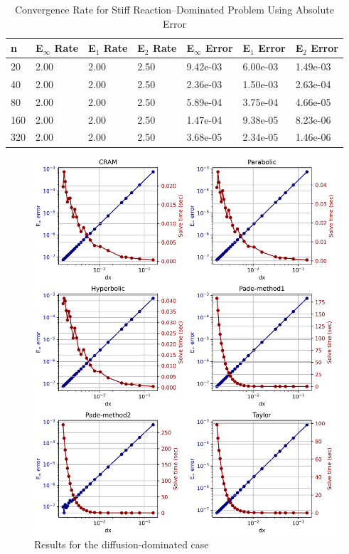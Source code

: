 \begin{table}[h]
   \caption{\label{tab:diffusion_spatial_convergence_stiff_reaction_dom} Convergence Rate for Stiff Reaction--Dominated Problem Using Absolute Error}
   \centering
   \begin{tabular}{lllllll}
   \hline
    n & E${}_{\infty}$ Rate & E${}_{1}$ Rate & E${}_{2}$ Rate & E${}_{\infty}$ Error & E${}_{1}$ Error & E${}_{2}$ Error\\
   \hline
    20 & 2.00 & 2.00 & 2.50 & 9.42e-03 & 6.00e-03 & 1.49e-03 \\ 
    40 & 2.00 & 2.00 & 2.50 & 2.36e-03 & 1.50e-03 & 2.63e-04 \\ 
    80 & 2.00 & 2.00 & 2.50 & 5.89e-04 & 3.75e-04 & 4.66e-05 \\ 
   160 & 2.00 & 2.00 & 2.50 & 1.47e-04 & 9.38e-05 & 8.23e-06 \\ 
   320 & 2.00 & 2.00 & 2.50 & 3.68e-05 & 2.34e-05 & 1.46e-06 \\ 
   \hline
   \end{tabular}
\end{table}

\clearpage

\begin{figure}[p]
    \centering
    \includegraphics[width=5.0in]{images/chapter-5/progressionProblems/problem2/problem2a.png}
    \caption{Results for the diffusion-dominated case}
    \label{fig:problem2_diffusion_dom}
\end{figure}


